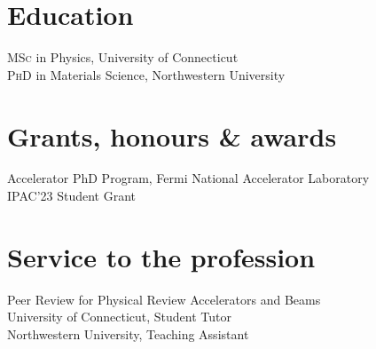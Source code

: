 \documentclass[11pt]{article} %
\begin{document}



\section*{Education}

\textsc{MSc} in Physics, University of Connecticut\\
\textsc{PhD} in Materials Science, Northwestern University


\section*{Grants, honours \& awards}

Accelerator PhD Program, Fermi National Accelerator Laboratory\\
IPAC'23 Student Grant





\section*{Service to the profession}

Peer Review for Physical Review Accelerators and Beams\\
 University of Connecticut, Student Tutor\\
 Northwestern University, Teaching Assistant

\vfill %
\end{document}
